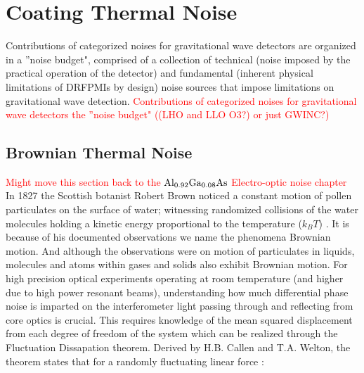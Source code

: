 \section{Coating Thermal Noise}
Contributions of categorized noises for gravitational wave detectors are organized in a ''noise budget", comprised of a collection of technical (noise imposed by the practical operation of the detector) and fundamental (inherent physical limitations of DRFPMIs by design) noise sources that impose limitations on gravitational wave detection.
\textcolor{red}{Contributions of categorized noises for gravitational wave detectors the ''noise budget" ((LHO and LLO O3?) or just GWINC?)}

\subsection{Brownian Thermal Noise}
\textcolor{red}{Might move this section back to the $\mathrm{Al_{0.92}Ga_{0.08}As}$ Electro-optic noise chapter}
\\
In 1827 the Scottish botanist Robert Brown noticed a constant motion of pollen particulates on the surface of water; witnessing randomized collisions of the water molecules holding a kinetic energy proportional to the temperature ($k_BT$) \cite{Brown:1828}. It is because of his documented observations we name the phenomena Brownian motion. And although the observations were on motion of particulates in liquids, molecules and atoms within gases and solids also exhibit Brownian motion. For high precision optical experiments operating at room temperature (and higher due to high power resonant beams), understanding how much differential phase noise is imparted on the interferometer light passing through and reflecting from core optics is crucial. This requires knowledge of the mean squared displacement from each degree of freedom of the system which can be realized through the Fluctuation Dissapation theorem. Derived by H.B. Callen and T.A. Welton, the theorem states that for a randomly fluctuating linear force \cite{Callen:1951}:





